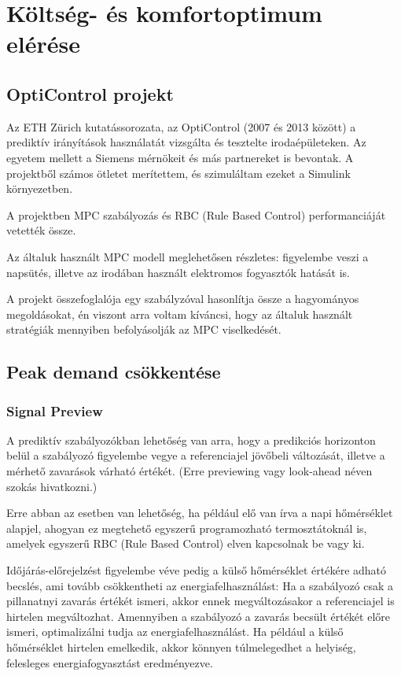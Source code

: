 \chapter{Költség- és komfortoptimum elérése}

\section{OptiControl projekt}
Az ETH Zürich kutatássorozata, az OptiControl \cite{Opticontrol-II} (2007 és 2013 között) a prediktív irányítások használatát vizsgálta és tesztelte irodaépületeken. Az egyetem mellett a Siemens mérnökeit és más partnereket is bevontak. A projektből számos ötletet merítettem, és szimuláltam ezeket a Simulink környezetben.


A projektben MPC szabályozás és RBC (Rule Based Control) performanciáját vetették össze.

Az általuk használt MPC modell meglehetősen részletes: figyelembe veszi a napsütés, illetve az irodában használt elektromos fogyasztók hatását is.

A projekt összefoglalója egy szabályzóval hasonlítja össze a hagyományos megoldásokat, én viszont arra voltam kíváncsi, hogy az általuk használt stratégiák mennyiben befolyásolják az MPC viselkedését.



\section{Peak demand csökkentése}



\subsection{Signal Preview} A prediktív szabályozókban lehetőség van arra, hogy a predikciós horizonton belül a szabályozó figyelembe vegye a referenciajel jövőbeli változását, illetve a mérhető zavarások várható értékét. (Erre previewing vagy look-ahead néven szokás hivatkozni.)


Erre abban az esetben van lehetőség, ha például elő van írva a napi hőmérséklet alapjel, ahogyan ez megtehető egyszerű programozható termosztátoknál is, amelyek egyszerű RBC (Rule Based Control) elven kapcsolnak be vagy ki.


Időjárás-előrejelzést figyelembe véve pedig a külső hőmérséklet értékére adható becslés, ami tovább csökkentheti az energiafelhasználást: Ha a szabályozó csak a pillanatnyi zavarás értékét ismeri, akkor ennek megváltozásakor a referenciajel is hirtelen megváltozhat. Amennyiben a szabályozó a zavarás becsült értékét előre ismeri, optimalizálni tudja az energiafelhasználást. Ha például a külső hőmérséklet hirtelen emelkedik, akkor könnyen túlmelegedhet a helyiség, felesleges energiafogyasztást eredményezve.



